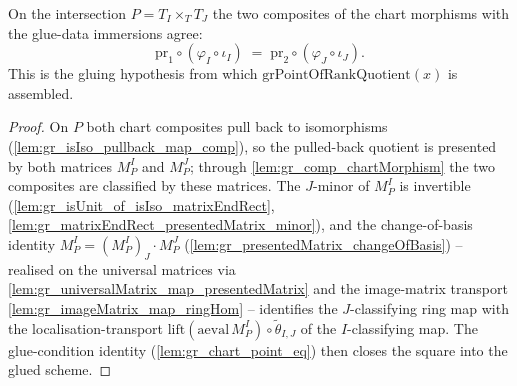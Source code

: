 \begin{lemma}
  \label{lem:gr_chartMorphism_glue_compat}
  On the intersection \(P = T_I \times_T T_J\) the two composites of the chart morphisms
  with the glue-data immersions agree:
  \[
    \mathrm{pr}_1 \circ (\varphi_I \circ \iota_I)
      \;=\; \mathrm{pr}_2 \circ (\varphi_J \circ \iota_J).
  \]
  This is the gluing hypothesis from which \(\mathrm{grPointOfRankQuotient}(x)\) is
  assembled.
\end{lemma}
\begin{proof}
  On \(P\) both chart composites pull back to isomorphisms
  (\cref{lem:gr_isIso_pullback_map_comp}), so the pulled-back quotient is presented by both
  matrices \(M^I_P\) and \(M^J_P\); through \cref{lem:gr_comp_chartMorphism} the two
  composites are classified by these matrices. The \(J\)-minor of \(M^I_P\) is invertible
  (\cref{lem:gr_isUnit_of_isIso_matrixEndRect},
  \cref{lem:gr_matrixEndRect_presentedMatrix_minor}), and the change-of-basis identity
  \(M^I_P = (M^I_P)_J \cdot M^J_P\) (\cref{lem:gr_presentedMatrix_changeOfBasis}) --
  realised on the universal matrices via
  \cref{lem:gr_universalMatrix_map_presentedMatrix} and the image-matrix transport
  \cref{lem:gr_imageMatrix_map_ringHom} -- identifies the \(J\)-classifying ring map with
  the localisation-transport \(\mathrm{lift}(\mathrm{aeval}\,M^I_P) \circ
  \tilde\theta_{I,J}\) of the \(I\)-classifying map. The glue-condition identity
  (\cref{lem:gr_chart_point_eq}) then closes the square into the glued scheme.
\end{proof}

